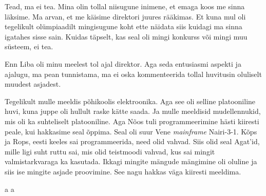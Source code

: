 
Tead, ma ei tea. Mina olin tollal niisugune inimene, et emaga koos me sinna 
läksime. Ma arvan, et me käisime direktori juures rääkimas. Et kuna mul oli 
tegelikult olümpiaadilt mingisugune koht ette näidata siis kuidagi ma sinna 
igatahes sisse sain. Kuidas täpselt, kas seal oli mingi konkurss või mingi muu 
süsteem, ei tea. 


Enn Liba oli minu meelest tol ajal direktor. Aga 
seda entusiasmi aspekti ja ajalugu, ma pean tunnistama,  ma ei oska 
kommenteerida tollal huvitusin  oluliselt muudest asjadest.


Tegelikult mulle meeldis põhikoolis elektroonika. Aga see oli selline 
platooniline huvi, kuna juppe oli hullult raske kätte saada. Ja mulle meeldisid 
mudellennukid, mis oli ka suhteliselt platooniline. Aga Nõos tuli 
programmeerimine hästi kiiresti peale, kui hakkasime seal õppima. Seal oli suur 
Vene \emph{mainframe} Nairi-3-1. 
Kõps ja Rops, eesti keeles sai 
programmeerida, need olid  vahvad. Siis olid seal Agat'id, 
mille ligi suht ruttu sai, mis olid teistmoodi vahvad, kus sai mingit 
valmistarkvaraga ka kasutada. Ikkagi mingite mängude mängimine oli oluline ja  
siis ise mingite asjade proovimine. See nagu hakkas väga kiiresti meeldima.

a  a

